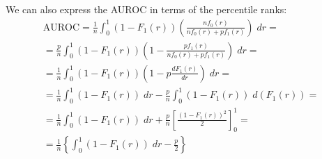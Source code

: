
We can also express the AUROC in terms of the percentile ranks:
%
\begin{multline*}
    \text{AUROC}
    = \frac{1}{n} \int_{0}^{1}
        (1 - F_1(r)) \left(\frac{n f_0(r)}{nf_0(r) + pf_1(r)}\right) \;dr
    =\\
    =  \frac{p}{n} \int_{0}^{1}
        (1 - F_1(r)) \left(1 - \frac{pf_1(r)}{nf_0(r) + pf_1(r)}\right) \;dr
    =\\
        = \frac{1}{n} \int_{0}^{1} (1 - F_1(r)) \left(1 - p \frac{dF_1(r)}{dr}\right) \;dr
    =\\
    =
        \frac{1}{n} \int_{0}^{1} (1 - F_1(r)) \;dr
        - \frac{p}{n} \int_{0}^{1}
            (1 - F_1(r)) \;d(F_1(r))
    =\\
    =
        \frac{1}{n} \int_{0}^{1} (1 - F_1(r)) \;dr
        + \frac{p}{n} \left[
            \frac{(1 - F_1(r))^2}{2}
        \right]^1_0
    =\\
    =
        \frac{1}{n} \left\{
            \int_{0}^{1} (1 - F_1(r)) \;dr - \frac{p}{2}
        \right\}
    \label{eq:auroc ranks}
\end{multline*}

